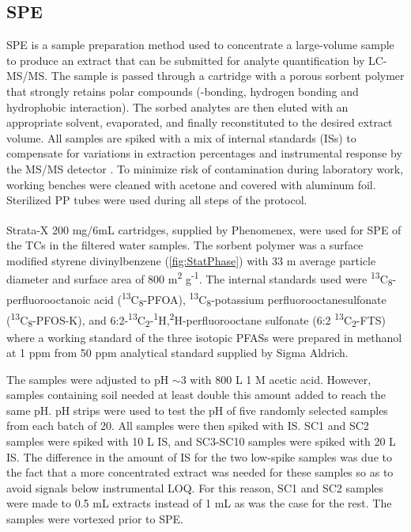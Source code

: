 \subsection{SPE}
SPE is a sample preparation method used to concentrate a large-volume sample to produce an extract that can be submitted for analyte quantification by LC-MS/MS. The sample is passed through a cartridge with a porous sorbent polymer that strongly retains polar compounds (\textpi-\textpi bonding, hydrogen bonding and hydrophobic interaction). The sorbed analytes are then eluted with an appropriate solvent, evaporated, and finally reconstituted to the desired extract volume. All samples are spiked with a mix of internal standards (ISs) to compensate for variations in extraction percentages and instrumental response by the MS/MS detector \citep{arvaniti2014}. To minimize risk of contamination during laboratory work, working benches were cleaned with acetone and covered with aluminum foil. Sterilized PP tubes were used during all steps of the protocol.

Strata-X\textsuperscript{\textregistered} 200 mg/6mL cartridges, supplied by Phenomenex, were used for SPE of the TCs in the filtered water samples. The sorbent polymer was a surface modified styrene divinylbenzene (\cref{fig:StatPhase}) with 33 \textmu m average particle diameter and surface area of 800 m\textsuperscript{2} g\textsuperscript{-1}. The internal standards used were \textsuperscript{13}C\textsubscript{8}-perfluorooctanoic acid  (\textsuperscript{13}C\textsubscript{8}-PFOA), \textsuperscript{13}C\textsubscript{8}-potassium perfluorooctanesulfonate (\textsuperscript{13}C\textsubscript{8}-PFOS-K), and 6:2-\textsuperscript{13}C\textsubscript{2}-\textsuperscript{1}H,\textsuperscript{2}H-perfluorooctane sulfonate  (6:2 \textsuperscript{13}C\textsubscript{2}-FTS) where a working standard of the three isotopic PFASs were prepared in methanol at 1 ppm from 50 ppm analytical standard supplied by Sigma Aldrich.

The samples were adjusted to pH $\sim$3 with 800 \textmu L 1 M acetic acid. However, samples containing soil needed at least double this amount added to reach the same pH. pH strips were used to test the pH of five randomly selected samples from each batch of 20. All samples were then spiked with IS. SC1 and SC2 samples were spiked with 10 \textmu L IS, and SC3-SC10 samples were spiked with 20 \textmu L IS. The difference in the amount of IS for the two low-spike samples was due to the fact that a more concentrated extract was needed for these samples  so as to avoid signals below instrumental LOQ.  For this reason, SC1 and SC2 samples were made to 0.5 mL extracts instead of 1 mL as was the case for the rest. The samples were vortexed prior to SPE.

